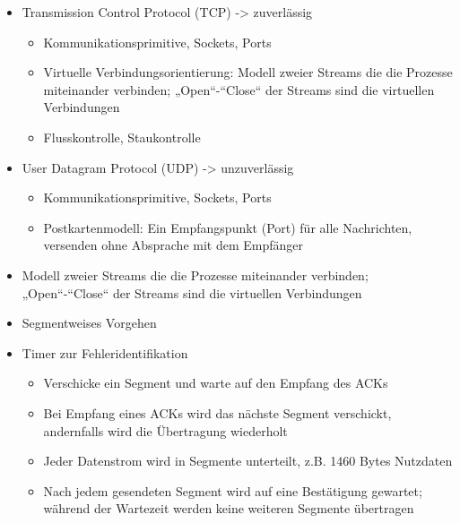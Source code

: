 
\begin{itemize}
    \item Transmission Control Protocol (TCP) -> zuverlässig
    \begin{itemize}
        \item Kommunikationsprimitive, Sockets, Ports
        \item Virtuelle Verbindungsorientierung: Modell zweier Streams die die Prozesse miteinander verbinden;
        „Open“-“Close“ der Streams sind die virtuellen Verbindungen
        \item Flusskontrolle, Staukontrolle
    \end{itemize}
    \item User Datagram Protocol (UDP) -> unzuverlässig
    \begin{itemize}
        \item Kommunikationsprimitive, Sockets, Ports
        \item Postkartenmodell: Ein Empfangspunkt (Port) für alle Nachrichten, versenden ohne Absprache mit dem Empfänger
    \end{itemize}
\end{itemize}

\begin{itemize}
    \item Modell zweier Streams die die Prozesse miteinander verbinden;
    „Open“-“Close“ der Streams sind die virtuellen Verbindungen
\end{itemize}

\begin{itemize}
    \item Segmentweises Vorgehen
    \item Timer zur Fehleridentifikation
    \begin{itemize}
        \item Verschicke ein Segment und warte auf den Empfang des ACKs
        \item Bei Empfang eines ACKs wird das nächste Segment verschickt, andernfalls wird die Übertragung wiederholt
        \item Jeder Datenstrom wird in Segmente unterteilt, z.B. 1460 Bytes Nutzdaten
        \item Nach jedem gesendeten Segment wird auf eine Bestätigung gewartet;
        während der Wartezeit werden keine weiteren Segmente übertragen
    \end{itemize}
\end{itemize}

